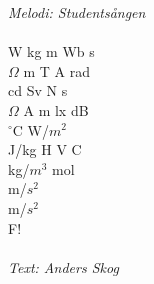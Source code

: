 {\footnotesize\textit{Melodi: Studentsången}}\\
\\
W kg m Wb s\\
$\Omega$ m T A rad\\
cd Sv N s\\
$\Omega$  A m lx dB\\
$^{\circ}$C W/$m^{2}$\\
J/kg H V C\\
kg/$m^{3}$ mol\\
m/$s^{2}$\\
m/$s^{2}$\\
F!\\
\\
{\footnotesize\textit{Text: Anders Skog}}
